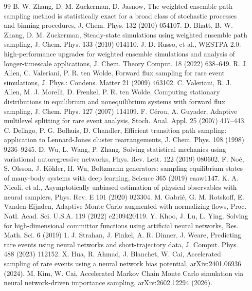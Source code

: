 \documentclass[a4paper,fleqn]{cas-sc}
\begin{document}
\begin{thebibliography}{99}
 B. W. Zhang, D. M. Zuckerman, D. Jasnow, The weighted ensemble path sampling
method is statistically exact for a broad class of stochastic processes and binning procedures,
J. Chem. Phys. 132 (2010) 054107.
 D. Bhatt, B. W. Zhang, D. M. Zuckerman, Steady-state simulations using
weighted ensemble path sampling, J. Chem. Phys. 133 (2010) 014110.
 J. D. Russo, et al., WESTPA 2.0: high-performance upgrades for weighted
ensemble simulations and analysis of longer-timescale applications, J. Chem. Theory Comput. 18
(2022) 638--649.
 R. J. Allen, C. Valeriani, P. R. ten Wolde, Forward flux sampling for rare
event simulations, J. Phys.: Condens. Matter 21 (2009) 463102.
 C. Valeriani, R. J. Allen, M. J. Morelli, D. Frenkel, P. R. ten Wolde,
Computing stationary distributions in equilibrium and nonequilibrium systems with forward flux
sampling, J. Chem. Phys. 127 (2007) 114109.
 F. C\'erou, A. Guyader, Adaptive multilevel splitting for rare event analysis,
Stoch. Anal. Appl. 25 (2007) 417--443.
 C. Dellago, P. G. Bolhuis, D. Chandler, Efficient transition path sampling:
application to Lennard-Jones cluster rearrangements, J. Chem. Phys. 108 (1998) 9236--9245.
 D. Wu, L. Wang, P. Zhang, Solving statistical mechanics using variational
autoregressive networks, Phys. Rev. Lett. 122 (2019) 080602.
 F. No\'e, S. Olsson, J. K\"ohler, H. Wu, Boltzmann generators: sampling
equilibrium states of many-body systems with deep learning, Science 365 (2019) eaaw1147.
 K. A. Nicoli, et al., Asymptotically unbiased estimation of physical
observables with neural samplers, Phys. Rev. E 101 (2020) 023304.
 M. Gabri\'e, G. M. Rotskoff, E. Vanden-Eijnden, Adaptive Monte Carlo augmented
with normalizing flows, Proc. Natl. Acad. Sci. U.S.A. 119 (2022) e2109420119.
 Y. Khoo, J. Lu, L. Ying, Solving for high-dimensional committor functions using
artificial neural networks, Res. Math. Sci. 6 (2019) 1.
 J. Strahan, J. Finkel, A. R. Dinner, J. Weare, Predicting rare events using
neural networks and short-trajectory data, J. Comput. Phys. 488 (2023) 112152.
 X. Hua, R. Ahmad, J. Blanchet, W. Cai, Accelerated sampling of rare events using
a neural network bias potential, arXiv:2401.06936 (2024).
 M. Kim, W. Cai, Accelerated Markov Chain Monte Carlo simulation via neural
network-driven importance sampling, arXiv:2602.12294 (2026).

\end{thebibliography}
\end{document}
